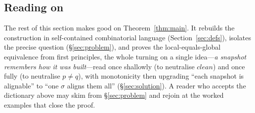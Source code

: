\subsection*{Reading on}

The rest of this section makes good on Theorem~\ref{thm:main}.  It
rebuilds the construction in self-contained combinatorial language
(Section~\ref{sec:defs}), isolates the precise question
(\S\ref{sec:problem}), and proves the local-equals-global equivalence from
first principles, the whole turning on a single idea---\emph{a snapshot
remembers how it was built}---read once shallowly (to neutralise $clean$) and
once fully (to neutralise $p\neq q$), with monotonicity then upgrading
``each snapshot is alignable'' to ``one $\sigma$ aligns them all''
(\S\ref{sec:solution}).  A reader who accepts the dictionary above may skim from
\S\ref{sec:problem} and rejoin at the worked examples that close the proof.
